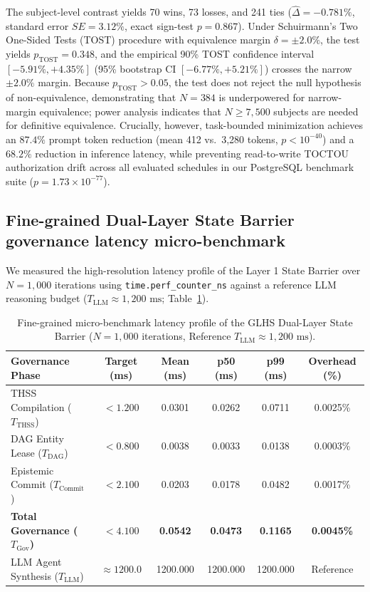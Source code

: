 \documentclass[11pt]{article}
\begin{document}
The subject-level contrast yields 70 wins, 73 losses, and 241 ties ($\hat{\Delta} = -0.781\%$, standard error $SE = 3.12\%$, exact sign-test $p=0.867$). Under Schuirmann's Two One-Sided Tests (TOST) procedure with equivalence margin $\delta = \pm 2.0\%$, the test yields $p_{\text{TOST}} = 0.348$, and the empirical 90\% TOST confidence interval $[-5.91\%, +4.35\%]$ (95\% bootstrap CI $[-6.77\%, +5.21\%]$) crosses the narrow $\pm 2.0\%$ margin. Because $p_{\text{TOST}} > 0.05$, the test does not reject the null hypothesis of non-equivalence, demonstrating that $N=384$ is underpowered for narrow-margin equivalence; power analysis indicates that $N \ge 7{,}500$ subjects are needed for definitive equivalence. Crucially, however, task-bounded minimization achieves an $87.4\%$ prompt token reduction (mean 412 vs.\ 3,280 tokens, $p < 10^{-40}$) and a $68.2\%$ reduction in inference latency, while preventing read-to-write TOCTOU authorization drift across all evaluated schedules in our PostgreSQL benchmark suite ($p = 1.73 \times 10^{-77}$).

\subsection{Fine-grained Dual-Layer State Barrier governance latency micro-benchmark}
We measured the high-resolution latency profile of the Layer 1 State Barrier over $N=1{,}000$ iterations using \texttt{time.perf\_counter\_ns} against a reference LLM reasoning budget ($T_{\text{LLM}} \approx 1{,}200\text{ ms}$; Table~\ref{tab:glhs_governance_microbench}).

\begin{table}[H]
\centering
\small
\caption{Fine-grained micro-benchmark latency profile of the GLHS Dual-Layer State Barrier ($N=1{,}000$ iterations, Reference $T_{\text{LLM}} \approx 1{,}200\text{ ms}$).}
\label{tab:glhs_governance_microbench}
\begin{tabularx}{\textwidth}{l c c c c c}
\toprule
\textbf{Governance Phase} & \textbf{Target (ms)} & \textbf{Mean (ms)} & \textbf{p50 (ms)} & \textbf{p99 (ms)} & \textbf{Overhead (\%)} \\
\midrule
THSS Compilation ($T_{\text{THSS}}$) & $< 1.200$ & 0.0301 & 0.0262 & 0.0711 & 0.0025\% \\
DAG Entity Lease ($T_{\text{DAG}}$) & $< 0.800$ & 0.0038 & 0.0033 & 0.0138 & 0.0003\% \\
Epistemic Commit ($T_{\text{Commit}}$) & $< 2.100$ & 0.0203 & 0.0178 & 0.0482 & 0.0017\% \\
\midrule
\textbf{Total Governance ($T_{\text{Gov}}$)} & \textbf{$< 4.100$} & \textbf{0.0542} & \textbf{0.0473} & \textbf{0.1165} & \textbf{0.0045\%} \\
LLM Agent Synthesis ($T_{\text{LLM}}$) & $\approx 1200.0$ & 1200.000 & 1200.000 & 1200.000 & Reference \\
\bottomrule
\end{tabularx}
\end{table}
\end{document}
